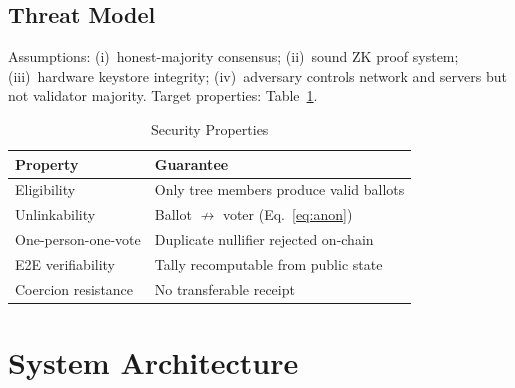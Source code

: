 \documentclass[conference]{IEEEtran}
\theoremstyle{definition}
\theoremstyle{plain}
\begin{document}
\subsection{Threat Model}
Assumptions: (i)~honest-majority consensus; (ii)~sound ZK proof system; (iii)~hardware keystore integrity; (iv)~adversary controls network and servers but not validator majority. Target properties: Table~\ref{tab:props}.

\begin{table}[t]
\caption{Security Properties}
\centering\small
\begin{tabular}{@{}ll@{}}
\toprule
\textbf{Property} & \textbf{Guarantee} \\
\midrule
Eligibility & Only tree members produce valid ballots \\
Unlinkability & Ballot $\not\to$ voter (Eq.~\ref{eq:anon}) \\
One-person-one-vote & Duplicate nullifier rejected on-chain \\
E2E verifiability & Tally recomputable from public state \\
Coercion resistance & No transferable receipt \\
\bottomrule
\end{tabular}
\label{tab:props}
\end{table}

\section{System Architecture}
\end{document}

